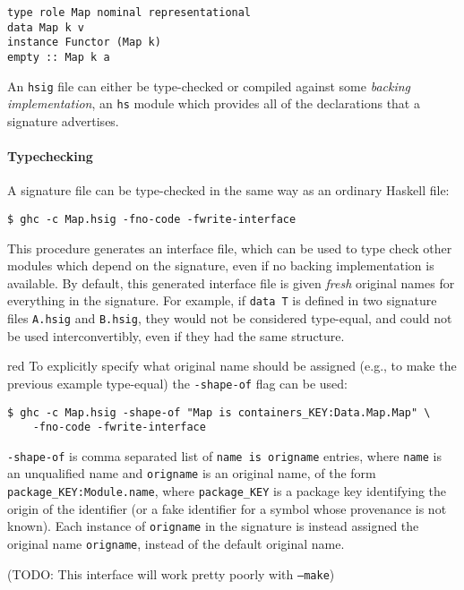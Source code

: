 \documentclass{article}
\begin{document}
\begin{verbatim}
type role Map nominal representational
data Map k v
instance Functor (Map k)
empty :: Map k a
\end{verbatim}

An \texttt{hsig} file can either be type-checked or compiled against some
\emph{backing implementation}, an \texttt{hs} module which provides all
of the declarations that a signature advertises.

\paragraph{Typechecking} A signature file can be type-checked in the same
way as an ordinary Haskell file:

\begin{verbatim}
$ ghc -c Map.hsig -fno-code -fwrite-interface
\end{verbatim}

This procedure generates an interface file, which can be used to type
check other modules which depend on the signature, even if no backing
implementation is available.  By default, this generated interface file
is given \emph{fresh} original names for everything in the signature.
For example, if \texttt{data T} is defined in two signature files
\texttt{A.hsig} and \texttt{B.hsig}, they would not be considered
type-equal, and could not be used interconvertibly, even if they
had the same structure.

\begin{color}{red}
To explicitly specify what original name should be assigned (e.g.,
to make the previous example type-equal) the \texttt{-shape-of} flag
can be used:

\begin{verbatim}
$ ghc -c Map.hsig -shape-of "Map is containers_KEY:Data.Map.Map" \
    -fno-code -fwrite-interface
\end{verbatim}

\texttt{-shape-of} is comma separated list of \texttt{name is origname}
entries, where \texttt{name} is an unqualified name and
\texttt{origname} is an original name, of the form
\texttt{package\_KEY:Module.name}, where \texttt{package\_KEY} is a
package key identifying the origin of the identifier (or a fake
identifier for a symbol whose provenance is not known).  Each instance
of \texttt{origname} in the signature is instead assigned the original
name \texttt{origname}, instead of the default original name.

(TODO: This interface will work pretty poorly with \texttt{--make})
\end{color}
\end{document}
